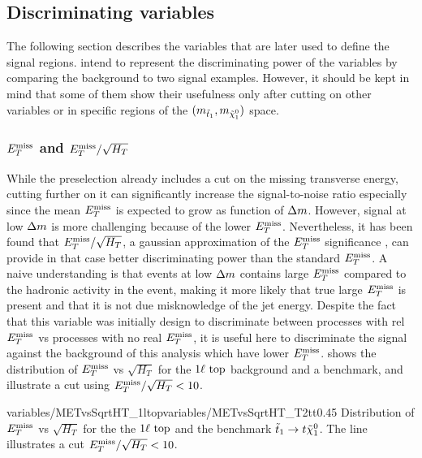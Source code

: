     \subsection{Discriminating variables \label{sec:analysis_variables}}

        The following section describes the variables that are later used to define the
        signal regions.  intend to represent the discriminating
        power of the variables by comparing the background to two signal examples. However,
        it should be kept in mind that some of them show their usefulness only after
        cutting on other variables or in specific regions of the $(m_{\tilde{t}_1},m_{\tilde{\chi}_1^0})$ space.

           \subsubsection{$E_T^\text{miss}$ and $E_T^\text{miss}/\sqrt{H_T}$}

        While the preselection already includes a cut on the missing transverse energy,
        cutting further on it can significantly increase the signal-to-noise ratio especially
        since the mean $E_T^\text{miss}$ is expected to grow as function of $\Delta m$. However, signal
        at low $\Delta m$ is more challenging because of the lower $E_T^\text{miss}$. Nevertheless,
        it has been found that $E_T^\text{miss}/\sqrt{H_T}$, a gaussian approximation of the $E_T^\text{miss}$
        significance \cite{METsignificanceMirman, METperf}, can provide in that case better
        discriminating power than the
        standard $E_T^\text{miss}$. A naive understanding is that events at low $\Delta m$ contains
        large $E_T^\text{miss}$ compared to the hadronic activity in the event, making it more likely
        that true large $E_T^\text{miss}$ is present and that it is not due misknowledge of the jet
        energy. Despite the fact that this variable was initially design to discriminate
        between processes with rel $E_T^\text{miss}$ vs processes with no real $E_T^\text{miss}$, it is useful here
        to discriminate the signal against the background of this analysis which have lower
        $E_T^\text{miss}$.  shows the distribution of $E_T^\text{miss}$ vs $\sqrt{H_T}$
        for the $1\ell~\text{top}$ background and a benchmark, and illustrate a cut using
        $E_T^\text{miss} / \sqrt{H_T} < 10$. 

                         {variables/METvsSqrtHT_1ltop}{variables/METvsSqrtHT_T2tt}{0.45}
                         {Distribution of $E_T^\text{miss}$ vs $\sqrt{H_T}$ for the the
                         $1\ell~\text{top}$ and the benchmark $\tilde{t}_1 \rightarrow t \tilde{\chi}_1^0$.
                         The line illustrates a cut $E_T^\text{miss} / \sqrt{H_T} < 10$.}

